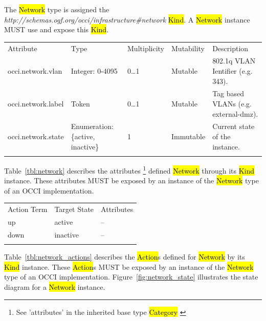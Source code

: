 \documentclass[10pt,a4paper]{article}
\begin{document}
The \hl{Network} type is assigned the \textit{http://schemas.ogf.org/occi/infrastructure\#network} \hl{Kind}. A \hl{Network} instance MUST use and expose this \hl{Kind}.


{
	\begin{tabular}{lp{2.5cm}p{1cm}lp{6cm}}
	\toprule
	Attribute&Type&Multi\-plicity&Mutability&Description\\
	\colrule
	occi.network.vlan & Integer: 0-4095 & 0\ldots1 & Mutable 
	& 802.1q VLAN Ientifier (e.g. 343).\\
	occi.network.label & Token & 0\ldots1 & Mutable 
	& Tag based VLANs (e.g. external-dmz).\\
	occi.network.state & Enumeration: \{active, inactive\} & 1 & Immutable 
	& Current state of the instance.\\
	\botrule
	\end{tabular}
}
Table~\ref{tbl:network} describes the attributes \footnote{See ’attributes’ in the inherited 
base type \hl{Category}  \cite{occi:core}} 
defined \hl{Network} through its \hl{Kind} instance. These attributes
MUST be exposed by an instance of the \hl{Network} type of an OCCI implementation.

{
	\begin{tabular}{lll}
	\toprule
	Action Term&Target State&Attributes\\
	\colrule
	up & active & --\\
	down & inactive & --\\
	\botrule
	\end{tabular}
}

Table~\ref{tbl:network_actions} describes the \hl{Action}s defined for
\hl{Network} by its \hl{Kind} instance. These \hl{Action}s MUST be exposed 
by an instance of the \hl{Network} type of an OCCI implementation. 
Figure~\ref{fig:network_state} illustrates the state diagram for a \hl{Network} instance.
\end{document}
